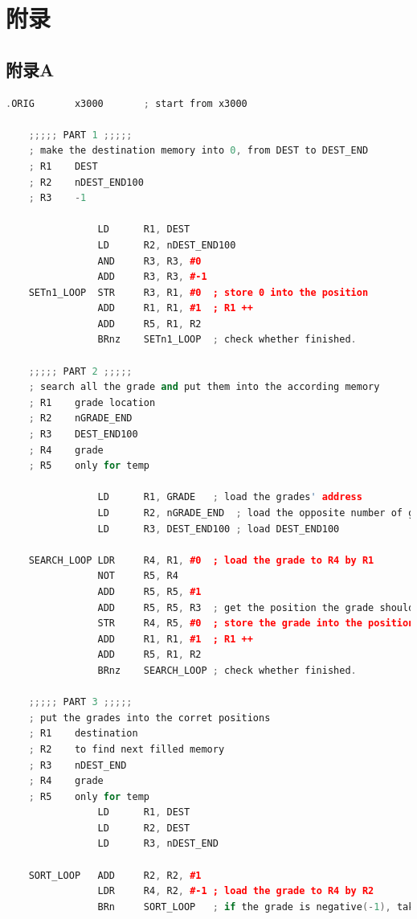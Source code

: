 \documentclass[UTF8]{article}
\begin{document}
	
	\section{附录}
	\subsection{附录A}
	
	\begin{lstlisting}[language=C++]
				.ORIG		x3000		; start from x3000
	
	;;;;; PART 1 ;;;;;
	; make the destination memory into 0, from DEST to DEST_END
	; R1	DEST
	; R2	nDEST_END100
	; R3	-1
	
				LD		R1, DEST
				LD		R2, nDEST_END100
				AND		R3, R3, #0
				ADD		R3, R3, #-1
	SETn1_LOOP	STR		R3, R1, #0	; store 0 into the position
				ADD		R1, R1, #1	; R1 ++
				ADD		R5, R1, R2	
				BRnz	SETn1_LOOP	; check whether finished.
	
	;;;;; PART 2 ;;;;;
	; search all the grade and put them into the according memory
	; R1	grade location
	; R2	nGRADE_END
	; R3	DEST_END100	
	; R4	grade
	; R5	only for temp
	
				LD		R1, GRADE	; load the grades' address
				LD		R2, nGRADE_END	; load the opposite number of grades' end address
				LD		R3, DEST_END100	; load DEST_END100
	
	SEARCH_LOOP	LDR		R4, R1, #0	; load the grade to R4 by R1	
				NOT		R5, R4
				ADD		R5, R5, #1
				ADD		R5, R5, R3	; get the position the grade should be
				STR		R4, R5, #0	; store the grade into the position
				ADD		R1, R1, #1	; R1 ++
				ADD		R5, R1, R2	
				BRnz	SEARCH_LOOP	; check whether finished.	
	
	;;;;; PART 3 ;;;;;
	; put the grades into the corret positions
	; R1	destination
	; R2	to find next filled memory
	; R3	nDEST_END
	; R4	grade
	; R5	only for temp 
				LD		R1, DEST
				LD		R2, DEST
				LD		R3, nDEST_END
				
	SORT_LOOP	ADD		R2, R2, #1	
				LDR		R4, R2, #-1	; load the grade to R4 by R2
				BRn		SORT_LOOP	; if the grade is negative(-1), take next
	

\end{lstlisting}
\end{document}
